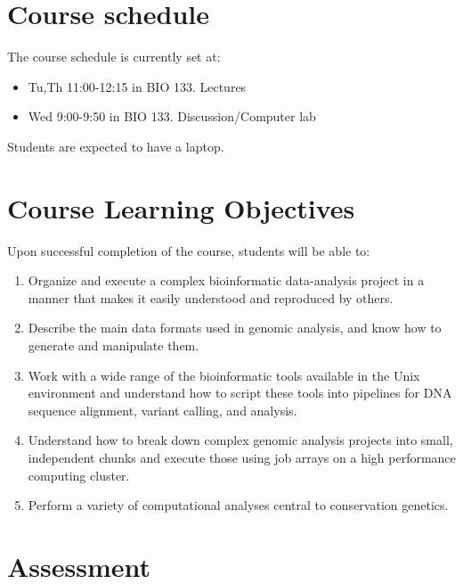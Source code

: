 \documentclass[]{book}
\providecommand{\tightlist}{%
  \setlength{\itemsep}{0pt}\setlength{\parskip}{0pt}}
\begin{document}
\hypertarget{course-schedule}{%
\section*{Course schedule}\label{course-schedule}}

The course schedule is currently set at:

\begin{itemize}
\tightlist
\item
  Tu,Th 11:00-12:15 in BIO 133. Lectures
\item
  Wed 9:00-9:50 in BIO 133. Discussion/Computer lab
\end{itemize}

Students are expected to have a laptop.

\hypertarget{course-learning-objectives}{%
\section*{Course Learning Objectives}\label{course-learning-objectives}}

Upon successful completion of the course, students will be able to:

\begin{enumerate}
\def\labelenumi{\arabic{enumi}.}
\tightlist
\item
  Organize and execute a complex bioinformatic data-analysis project in a manner that makes it easily understood and reproduced by others.
\item
  Describe the main data formats used in genomic analysis, and know how to generate and manipulate them.
\item
  Work with a wide range of the bioinformatic tools available in the Unix environment and understand how to script these tools into pipelines for DNA sequence alignment, variant calling, and analysis.
\item
  Understand how to break down complex genomic analysis projects into small, independent chunks and execute those using job arrays on a high performance computing cluster.
\item
  Perform a variety of computational analyses central to conservation genetics.
\end{enumerate}

\hypertarget{assessment}{%
\section*{Assessment}\label{assessment}}
\end{document}
